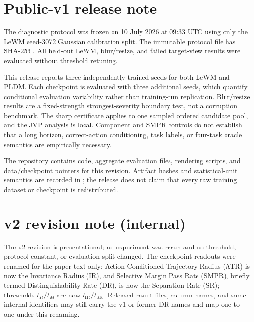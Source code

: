 \section*{Public-v1 release note}

The diagnostic protocol was frozen on 10 July 2026 at 09:33 UTC using only the LeWM seed-3072 Gaussian calibration split. The immutable protocol file has SHA-256
.
All held-out LeWM, blur/resize, and failed target-view results were evaluated without threshold retuning.

This release reports three independently trained seeds for both LeWM and PLDM. Each checkpoint is evaluated with three additional seeds, which quantify conditional evaluation variability rather than training-run replication. Blur/resize results are a fixed-strength strongest-severity boundary test, not a corruption benchmark. The sharp certificate applies to one sampled ordered candidate pool, and the JVP analysis is local. Component and SMPR controls do not establish that a long horizon, correct-action conditioning, task labels, or four-task oracle semantics are empirically necessary.

The repository contains code, aggregate evaluation files, rendering scripts, and data/checkpoint pointers for this revision. Artifact hashes and statistical-unit semantics are recorded in ; the release does not claim that every raw training dataset or checkpoint is redistributed.

\section*{v2 revision note (internal)}

The v2 revision is presentational; no experiment was rerun and no threshold,
protocol constant, or evaluation split changed. The checkpoint readouts were
renamed for the paper text only: Action-Conditioned Trajectory Radius (ATR)
is now the Invariance Radius (IR), and Selective Margin Pass Rate (SMPR),
briefly termed Distinguishability Rate (DR), is now the Separation Rate (SR);
thresholds $t_R/t_M$ are now $t_{\mathrm{IR}}/t_{\mathrm{SR}}$. Released
result files, column names, and some internal identifiers may still carry the
v1 or former-DR names and map one-to-one under this renaming.

